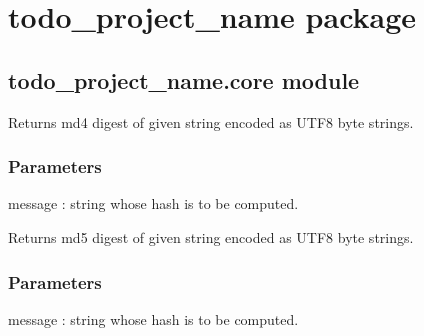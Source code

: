 \documentclass[letterpaper,10pt,english]{sphinxmanual}
\begin{document}
\chapter{todo\_project\_name package}
\label{\detokenize{modules:todo-project-name}}\label{\detokenize{modules::doc}}
\sphinxstepscope


\section{todo\_project\_name.core module}
\label{\detokenize{todo_project_name:module-todo_project_name.core}}\label{\detokenize{todo_project_name:todo-project-name-core-module}}

\begin{fulllineitems}
\label{\detokenize{todo_project_name:todo_project_name.core.md4_string}}
\pysigstartsignatures
{}
\pysigstopsignatures
\sphinxAtStartPar
Returns md4 digest of given string encoded as UTF\sphinxhyphen{}8 byte strings.


\subsection{Parameters}
\label{\detokenize{todo_project_name:parameters}}
\sphinxAtStartPar
message
: string whose hash is to be computed.

\end{fulllineitems}


\begin{fulllineitems}
\label{\detokenize{todo_project_name:todo_project_name.core.md5_string}}
\pysigstartsignatures
{}
\pysigstopsignatures
\sphinxAtStartPar
Returns md5 digest of given string encoded as UTF\sphinxhyphen{}8 byte strings.


\subsection{Parameters}
\label{\detokenize{todo_project_name:id1}}
\sphinxAtStartPar
message
: string whose hash is to be computed.

\end{fulllineitems}
\end{document}
